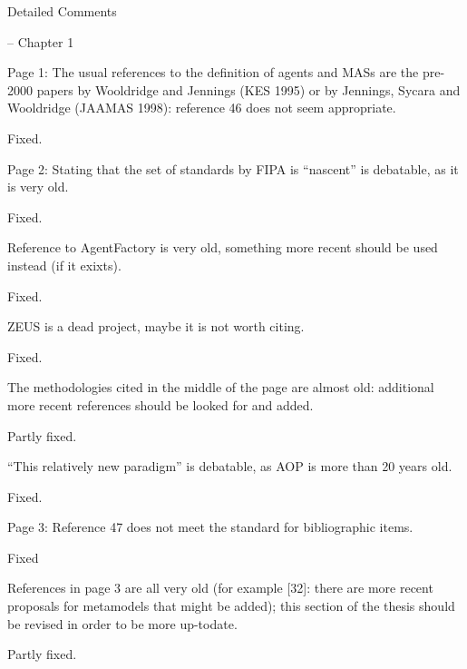 \documentclass{article}
\newenvironment{them}{\noindent\begingroup\color{blue}}{\endgroup\par}
\begin{document}
\begin{them}

Detailed Comments

-- Chapter 1

Page 1:
The usual references to the definition of agents and MASs are the pre-2000
papers by Wooldridge and Jennings (KES 1995) or by Jennings, Sycara and
Wooldridge (JAAMAS 1998): reference 46 does not seem appropriate.

\end{them}
Fixed.

\begin{them}

Page 2:
Stating that the set of standards by FIPA is “nascent” is debatable, as it is
very old.

\end{them}
Fixed.

\begin{them}

Reference to AgentFactory is very old, something more recent should be used
instead (if it exixts).

\end{them}
Fixed.

\begin{them}

ZEUS is a dead project, maybe it is not worth citing.
\end{them}
Fixed.

\begin{them}

The methodologies cited in the middle of the page are almost old: additional
more recent references should be looked for and added.

\end{them}
Partly fixed.

\begin{them}

“This relatively new paradigm” is debatable, as AOP is more than 20 years old.
\end{them}
Fixed.

\begin{them}

Page 3:
Reference 47 does not meet the standard for bibliographic items.

\end{them}
Fixed

\begin{them}

References in page 3 are all very old (for example [32]: there are more recent
proposals for metamodels that might be added); this section of the thesis
should be revised in order to be more up-todate.

\end{them}
Partly fixed.
\end{document}
